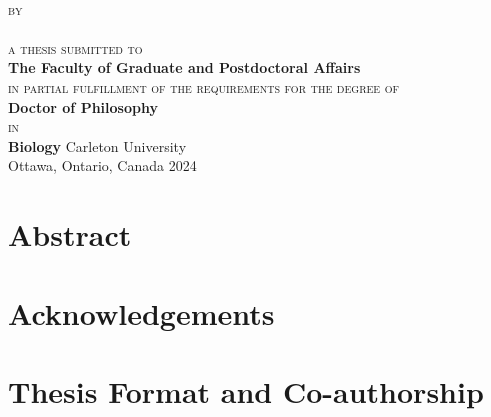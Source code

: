 \begin{titlepage}
  \thispagestyle{empty}
  \centering
  \vspace*{\fill}
  {\LARGE \textbf{\expandafter{\thesistitleI}}}\\[2mm]
  \vfill
  {\scshape by}\\
  {\large \expandafter{\myname}}\\
  \vfill
  {\scshape a thesis submitted to}\\
  \textbf{The Faculty of Graduate and Postdoctoral Affairs}\\
  {\scshape in partial fulfillment of the requirements for the degree of}\\
  \textbf{Doctor of Philosophy}\\
  {\scshape in}\\
  \textbf{Biology}
  \vfill
  {\large Carleton University}\\
  {\large Ottawa, Ontario, Canada}
  \vfill
  {\large \textcopyright{} 2024}\\
  {\large \expandafter{\myname}}
\end{titlepage}

\clearpage

\setcounter{page}{2}

\chapter*{Abstract}


\lipsum[1]



\chapter*{Acknowledgements}


\lipsum[2]

\chapter*{Thesis Format and Co-authorship}


\lipsum[2]


\clearpage

\tableofcontents

\listoffigures

\listoftables

\label{endfrontmatter} %
